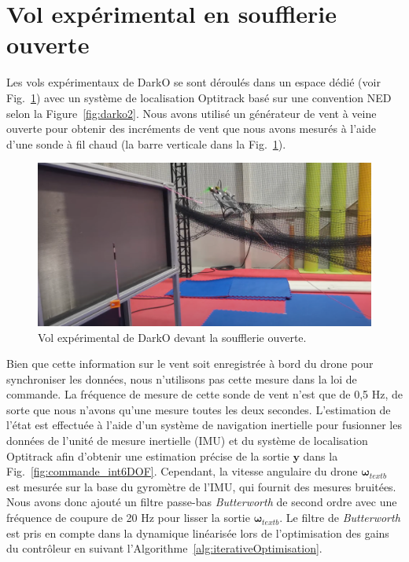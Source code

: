 \section{Vol expérimental en soufflerie ouverte} 
\label{sec:exp6DOF}

Les vols expérimentaux de DarkO se sont déroulés dans un espace dédié (voir Fig.~\ref{fig:flight_windshape}) avec un système de localisation Optitrack basé sur une convention NED selon la Figure~\ref{fig:darko2}. Nous avons utilisé un générateur de vent à veine ouverte pour obtenir des incréments de vent que nous avons mesurés à l'aide d'une sonde à fil chaud (la barre verticale dans la Fig.~\ref{fig:flight_windshape}). 
\begin{figure}[ht!]
    \centering
    \includegraphics[trim=0cm 0cm 0cm 0cm,clip,width=0.6\columnwidth]{figures/img_flight_darko.png}
    \caption{Vol expérimental de DarkO devant la soufflerie ouverte.}
    \label{fig:flight_windshape}
\end{figure}
Bien que cette information sur le vent soit enregistrée à bord du drone pour synchroniser les données, nous n'utilisons pas cette mesure dans la loi de commande. La fréquence de mesure de cette sonde de vent n'est que de 0,5 Hz, de sorte que nous n'avons qu'une mesure toutes les deux secondes. 
L'estimation de l'état est effectuée à l'aide d'un système de navigation inertielle pour fusionner les données de l'unité de mesure inertielle (IMU) et du système de localisation Optitrack afin d'obtenir une estimation précise de la sortie $\boldsymbol{y}$ dans la Fig.~\ref{fig:commande_int6DOF}. Cependant, la vitesse angulaire du drone $\boldsymbol{\omega}_{text{b}}$ est mesurée sur la base du gyromètre de l'IMU, qui fournit des mesures bruitées. Nous avons donc ajouté un filtre passe-bas \textit{Butterworth} de second ordre avec une fréquence de coupure de 20 Hz pour lisser la sortie $\boldsymbol{\omega}_{text{b}}$. Le filtre de \textit{Butterworth} est pris en compte dans la dynamique linéarisée lors de l'optimisation des gains du contrôleur en suivant l'Algorithme~\ref{alg:iterativeOptimisation}. 

